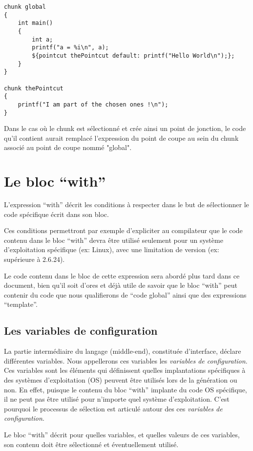 \documentclass[french]{rtxreport}
\begin{document}
\begin{lstlisting}
chunk global
{
    int main()
    {
        int a;
        printf("a = %i\n", a);
        ${pointcut thePointcut default: printf("Hello World\n");};
    }
}

chunk thePointcut
{
    printf("I am part of the chosen ones !\n");
}
\end{lstlisting}

Dans le cas où le chunk est sélectionné et crée ainsi un point de jonction, le
code qu'il contient aurait remplacé l'expression du point de coupe au sein du
chunk associé au point de coupe nommé "global".


\chapter{Le bloc “with”}

L'expression “with” décrit les conditions à respecter dans le but de
sélectionner le code spécifique écrit dans son bloc.

Ces conditions permettront par exemple d'expliciter au compilateur que le code
contenu dans le bloc “with” devra être utilisé seulement pour un système
d'exploitation spécifique (ex: Linux), avec une limitation de version
(ex: supérieure à 2.6.24).

Le code contenu dans le bloc de cette expression sera abordé plus tard dans ce
document, bien qu'il soit d'ores et déjà utile de savoir que le bloc “with” peut
contenir du code que nous qualifierons de ``code global'' ainsi que des
expressions ``template''.

\section{Les variables de configuration}

La partie intermédiaire du langage (middle-end), constituée d'interface, déclare
différentes variables. Nous appellerons ces variables les \emph{variables de
configuration}. Ces variables sont les éléments qui définissent quelles
implantations spécifiques à des systèmes d'exploitation (OS) peuvent être
utilisés lors de la génération ou non. En effet, puisque le contenu du bloc
“with” implante du code OS spécifique, il ne peut pas être utilisé pour
n'importe quel système d'exploitation. C'est pourquoi le processus de sélection
est articulé autour des ces \emph{variables de configuration}.

Le bloc “with” décrit pour quelles variables, et quelles valeurs de ces
variables, son contenu doit être sélectionné et éventuellement utilisé.
\end{document}

